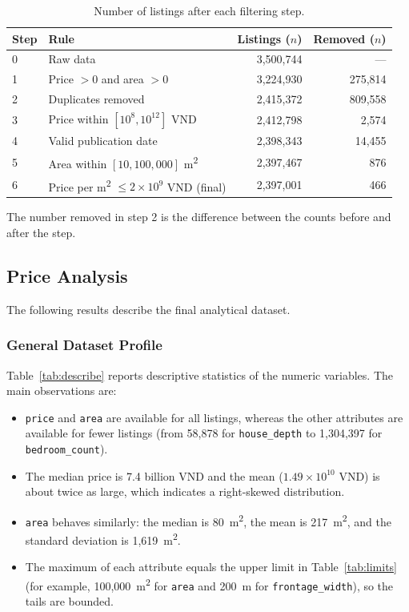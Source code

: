 \begin{table}[htbp]
\centering
\caption[Dataset filtering steps]{Number of listings after each filtering step.}
\label{tab:flow}
\small
\begin{tabular}{llrr}
\toprule
Step & Rule & Listings ($n$) & Removed ($n$) \\
\midrule
0 & Raw data                                         & 3,500,744 & --- \\
1 & Price $> 0$ and area $> 0$                       & 3,224,930 & 275,814 \\
2 & Duplicates removed                               & 2,415,372 & 809,558 \\
3 & Price within $[10^{8}, 10^{12}]$ VND             & 2,412,798 &   2,574 \\
4 & Valid publication date                           & 2,398,343 &  14,455 \\
5 & Area within $[10, 100{,}000]$ m\textsuperscript{2} & 2,397,467 &     876 \\
6 & Price per m\textsuperscript{2} $\leq 2\times10^{9}$ VND (final) & 2,397,001 & 466 \\
\bottomrule
\end{tabular}

\vspace{0.3em}
\footnotesize The number removed in step 2 is the difference between the counts before and after the step.
\end{table}

\subsection{Price Analysis}
\label{subsec:eda-price}

The following results describe the final analytical dataset.

\subsubsection{General Dataset Profile}

Table~\ref{tab:describe} reports descriptive statistics of the numeric variables. The main observations are:

\begin{itemize}
  \item \texttt{price} and \texttt{area} are available for all listings, whereas the other attributes are available for fewer listings (from 58,878 for \texttt{house\_depth} to 1,304,397 for \texttt{bedroom\_count}).
  \item The median price is 7.4 billion VND and the mean ($1.49\times10^{10}$ VND) is about twice as large, which indicates a right-skewed distribution.
  \item \texttt{area} behaves similarly: the median is 80~m\textsuperscript{2}, the mean is 217~m\textsuperscript{2}, and the standard deviation is 1,619~m\textsuperscript{2}.
  \item The maximum of each attribute equals the upper limit in Table~\ref{tab:limits} (for example, 100,000~m\textsuperscript{2} for \texttt{area} and 200~m for \texttt{frontage\_width}), so the tails are bounded.
\end{itemize}


